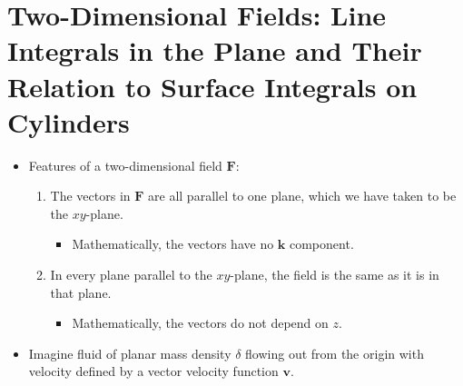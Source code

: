 \documentclass[../main.tex]{subfiles}
\begin{document}
\section{Two-Dimensional Fields: Line Integrals in the Plane and Their Relation to Surface Integrals on Cylinders}
\begin{itemize}
    \item Features of a two-dimensional field $\mathbf{F}$:
    \begin{enumerate}
        \item The vectors in $\mathbf{F}$ are all parallel to one plane, which we have taken to be the $xy$-plane.
        \begin{itemize}
            \item Mathematically, the vectors have no $\mathbf{k}$ component.
        \end{itemize}
        \item In every plane parallel to the $xy$-plane, the field is the same as it is in that plane.
        \begin{itemize}
            \item Mathematically, the vectors do not depend on $z$.
        \end{itemize}
    \end{enumerate}
    \item Imagine fluid of planar mass density $\delta$ flowing out from the origin with velocity defined by a vector velocity function $\mathbf{v}$.
    \begin{figure}[h!]
        \centering
\end{figure}
\end{itemize}
\end{document}
